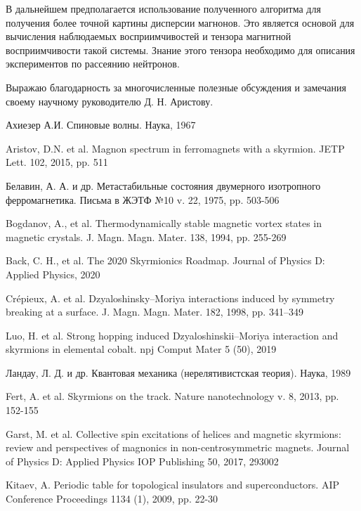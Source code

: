 \documentclass[a4paper,article,14pt]{extarticle}
\begin{document}
В дальнейшем предполагается использование полученного алгоритма для получения более точной картины дисперсии магнонов. Это является основой для вычисления наблюдаемых восприимчивостей и тензора магнитной восприимчивости такой системы. Знание этого тензора необходимо для описания экспериментов по рассеянию нейтронов.

Выражаю благодарность за многочисленные полезные обсуждения и замечания своему научному руководителю Д. Н. Аристову.


\pagebreak
\begin{thebibliography}{1}
 Ахиезер А.И. \flqq Спиновые волны\frqq. Наука, 1967

 Aristov, D.N. et al. \flqq Magnon spectrum in ferromagnets with a skyrmion\frqq. JETP Lett. 102, 2015, pp. 511

 Белавин, А. А. и др. \flqq Метастабильные состояния двумерного изотропного ферромагнетика\frqq. Письма в ЖЭТФ №10 v. 22, 1975, pp. 503-506

 Bogdanov, A., et al. \flqq Thermodynamically stable magnetic vortex states in magnetic crystals\frqq. J. Magn. Magn. Mater. 138, 1994, pp. 255-269
 
 Back, C. H., et al.  \flqq The 2020 Skyrmionics Roadmap\frqq. Journal of Physics D: Applied Physics, 2020

 Crépieux, A. et al. \flqq Dzyaloshinsky–Moriya interactions induced by symmetry breaking at a surface\frqq.  J. Magn. Magn. Mater. 182, 1998, pp. 341–349

 Luo, H. et al. \flqq Strong hopping induced Dzyaloshinskii–Moriya interaction and skyrmions in elemental cobalt\frqq. npj Comput Mater 5 (50), 2019

 Ландау, Л. Д. и др. \flqq Квантовая механика (нерелятивистская теория)\frqq. Наука, 1989

 Fert, A. et al. \flqq Skyrmions on the track\frqq. Nature nanotechnology v. 8, 2013, pp. 152-155

 Garst, M. et al. \flqq Collective spin excitations of helices and magnetic skyrmions: review and perspectives of magnonics in non-centrosymmetric magnets\frqq. Journal of Physics D: Applied Physics IOP Publishing 50, 2017, 293002

 Kitaev, A. \flqq Periodic table for topological insulators and superconductors\frqq. AIP Conference Proceedings 1134 (1), 2009, pp. 22-30


\end{thebibliography}
\end{document}
